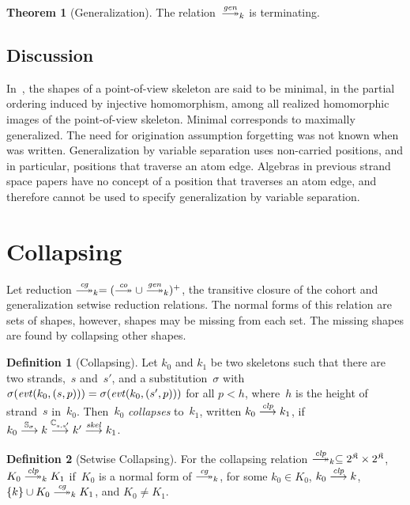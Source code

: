 \documentclass[12pt]{article}
\theoremstyle{definition}
\newtheorem{defn}{Definition}[section]
\newtheorem{thm}{Theorem}[section]
\begin{document}
\begin{thm}[Generalization]
The relation~$\setreduction{\fn{gen}}_k$ is terminating.
\end{thm}

\subsection*{Discussion}
In~\cite{DoghmiGuttmanThayer07}, the shapes of a point-of-view
skeleton are said to be minimal, in the partial ordering induced by
injective homomorphism, among all realized homomorphic images of the
point-of-view skeleton.  Minimal corresponds to maximally generalized.
The need for origination assumption forgetting was not known
when~\cite{DoghmiGuttmanThayer07} was written.  Generalization by
variable separation uses non-carried positions, and in particular,
positions that traverse an atom edge.  Algebras in previous strand
space papers have no concept of a position that traverses an atom
edge, and therefore cannot be used to specify generalization by
variable separation.

\section{Collapsing}\label{collapsing}

Let reduction $\setreduction{\fn{cg}}_k=(\setreduction{\fn{co}}\cup
\setreduction{\fn{gen}}_k)^+$, the transitive closure of the cohort
and generalization setwise reduction relations.  The normal forms of
this relation are sets of shapes, however, shapes may be missing from
each set.  The missing shapes are found by collapsing other shapes.

\begin{defn}[Collapsing]
Let $k_0$ and $k_1$ be two skeletons such that there are two
strands,~$s$ and~$s'$, and a substitution~$\sigma$ with
$\sigma(\operatorname{\mathit{evt}}(k_0,(s,p)))= \sigma(\operatorname{\mathit{evt}}(k_0,(s',p)))$ for all
$p<h$, where~$h$ is the height of strand~$s$ in~$k_0$.  Then~$k_0$
\emph{collapses} to~$k_1$, written $k_0\stackrel{\operatorname{\mathit{clp}}}{\longrightarrow}k_1$, if
$k_0\stackrel{\mathbb S_\sigma}{\longrightarrow}k\stackrel{\mathbb C_{s,s'}}{\longrightarrow}k'
\stackrel{\operatorname{\mathit{skel}}}{\longrightarrow}k_1$.
\end{defn}

\begin{defn}[Setwise Collapsing]
For the collapsing relation $\setreduction{\fn{clp}}_k\subseteq
\pow{\alg{K}}\times\pow{\alg{K}}$,
$K_0\setreduction{\fn{clp}}_k K_1$ if~$K_0$ is a normal form of
$\setreduction{\fn{cg}}_k$, for some $k_0\in K_0$, $k_0
\stackrel{\operatorname{\mathit{clp}}}{\longrightarrow}k$, $\{k\}\cup K_0\setreduction{\fn{cg}}_k K_1$,
and $K_0\neq K_1$.
\end{defn}
\end{document}
